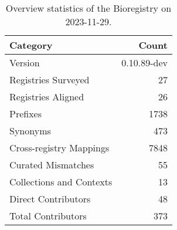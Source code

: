 \begin{table}
\caption{Overview statistics of the Bioregistry on 2023-11-29.}
\label{tab:bioregistry-summary}
\begin{tabular}{lr}
\toprule
Category & Count \\
\midrule
Version & 0.10.89-dev \\
Registries Surveyed & 27 \\
Registries Aligned & 26 \\
Prefixes & 1738 \\
Synonyms & 473 \\
Cross-registry Mappings & 7848 \\
Curated Mismatches & 55 \\
Collections and Contexts & 13 \\
Direct Contributors & 48 \\
Total Contributors & 373 \\
\bottomrule
\end{tabular}
\end{table}
